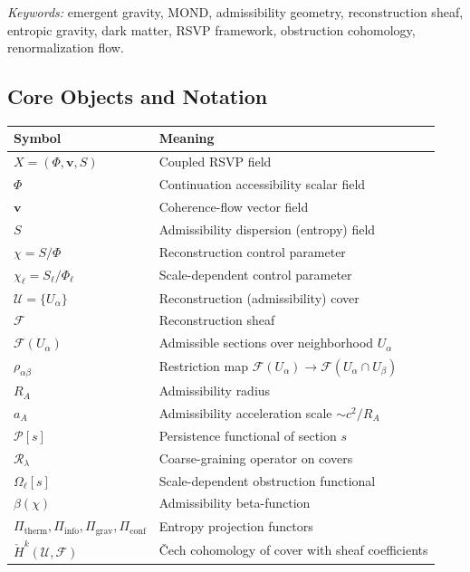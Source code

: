 \documentclass[11pt, a4paper]{article}
\theoremstyle{plain}
\theoremstyle{definition}
\theoremstyle{remark}
\newcommand{\RA}{R_{\!A}}
\newcommand{\aA}{a_{\!A}}
\newcommand{\sheaf}{\mathcal{F}}
\newcommand{\cover}{\{U_\alpha\}}
\newcommand{\Ucover}{\mathcal{U}}
\newcommand{\Rcoarse}{\mathcal{R}_\lambda}
\newcommand{\Pitherm}{\Pi_{\mathrm{therm}}}
\newcommand{\Piinfo}{\Pi_{\mathrm{info}}}
\newcommand{\Pigrav}{\Pi_{\mathrm{grav}}}
\newcommand{\Piconf}{\Pi_{\mathrm{conf}}}
\newcommand{\Hcech}{\check{H}}
\begin{document}
\vspace{1em}
\noindent\textit{Keywords:} emergent gravity, MOND, admissibility geometry,
reconstruction sheaf, entropic gravity, dark matter, RSVP framework, obstruction
cohomology, renormalization flow.

\newpage

\subsection*{Core Objects and Notation}

\begin{center}
\renewcommand{\arraystretch}{1.4}
\begin{tabular}{@{}lp{9cm}@{}}
\toprule
\textbf{Symbol} & \textbf{Meaning} \\
\midrule
$X = (\Phi, \mathbf{v}, S)$ & Coupled RSVP field \\
$\Phi$ & Continuation accessibility scalar field \\
$\mathbf{v}$ & Coherence-flow vector field \\
$S$ & Admissibility dispersion (entropy) field \\
$\chi = S/\Phi$ & Reconstruction control parameter \\
$\chi_\ell = S_\ell/\Phi_\ell$ & Scale-dependent control parameter \\
$\Ucover = \cover$ & Reconstruction (admissibility) cover \\
$\sheaf$ & Reconstruction sheaf \\
$\sheaf(U_\alpha)$ & Admissible sections over neighborhood $U_\alpha$ \\
$\rho_{\alpha\beta}$ & Restriction map $\sheaf(U_\alpha) \to \sheaf(U_\alpha \cap U_\beta)$ \\
$\RA$ & Admissibility radius \\
$\aA$ & Admissibility acceleration scale $\sim c^2/\RA$ \\
$\mathcal{P}[s]$ & Persistence functional of section $s$ \\
$\Rcoarse$ & Coarse-graining operator on covers \\
$\Omega_\ell[s]$ & Scale-dependent obstruction functional \\
$\beta(\chi)$ & Admissibility beta-function \\
$\Pitherm,\Piinfo,\Pigrav,\Piconf$ & Entropy projection functors \\
$\Hcech^k(\Ucover, \sheaf)$ & \v{C}ech cohomology of cover with sheaf coefficients \\
\bottomrule
\end{tabular}
\end{center}
\end{document}
